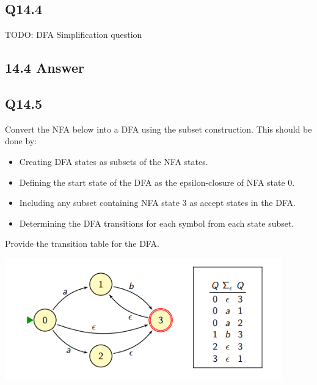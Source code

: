 \documentclass{article}
\begin{document}
\subsection*{Q14.4}
TODO: DFA Simplification question
\newpage
\subsection*{14.4 Answer}
\newpage
\subsection*{Q14.5}
Convert the NFA below into a DFA using the subset construction. This should be done by:
\begin{itemize}
  \item Creating DFA states as subsets of the NFA states.
  \item Defining the start state of the DFA as the epsilon-closure of NFA state 0.
  \item Including any subset containing NFA state 3 as accept states in the DFA.
  \item Determining the DFA transitions for each symbol from each state subset.
\end{itemize}
Provide the transition table for the DFA.
\begin{center}
    \includegraphics[width=12cm]{3.png}
\end{center}
\newpage
\end{document}
